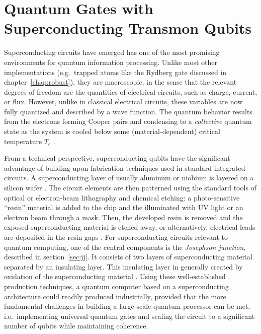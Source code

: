 \chapter{Quantum Gates with Superconducting Transmon Qubits}
\label{chap:transmon}

Superconducting circuits have emerged has one of the most promising
environments for quantum information processing. Unlike most other
implementations (e.g.\ trapped atoms like the Rydberg gate discussed in
chapter~\ref{chap:robust}), they are macroscopic, in the sense that the relevant
degrees of freedom are the quantities of electrical circuits, such as
charge, current, or flux. However, unlike in classical electrical circuits,
these variables are now fully quantized and described by a wave function. The
quantum behavior results from the electrons forming Cooper pairs and condensing
to a \emph{collective} quantum state as the system is cooled below some
(material-dependent) critical temperature $T_c$ \cite{TinkhamBook}.

From a technical perspective, superconducting qubits have the significant
advantage of building upon fabrication techniques used in standard integrated
circuits. A superconducting layer of usually aluminum or niobium is layered on
a silicon wafer
\cite{DevoretQIP2004, FrunzioITAS2005}.
The circuit elements are then patterned using the standard tools of optical or
electron-beam lithography and chemical etching: a photo-sensitive ``resin''
material is added to the chip and the illuminated with UV light or an electron
beam through a mask. Then, the developed resin is removed and the
exposed superconducting material is etched away, or alternatively, electrical
leads are deposited in the resin gaps \cite{HirstSCHandbook2003}.
For superconducting circuits relevant to quantum computing, one of the central
components is the \emph{Josephson junction}, described in
section~\ref{sec:jj}. It consists of two layers of superconducting material
separated by an insulating layer. This insulating layer in generally created by
oxidation of the superconducting material \cite{DevoretQIP2004,
FrunzioITAS2005}. Using these well-established production techniques,
a quantum computer based on a superconducting architecture could readily
produced industrially, provided that the more fundamental challenges in building
a large-scale quantum processor can be met, i.e.\ implementing universal quantum
gates and scaling the circuit to a significant number of qubits while
maintaining coherence.

